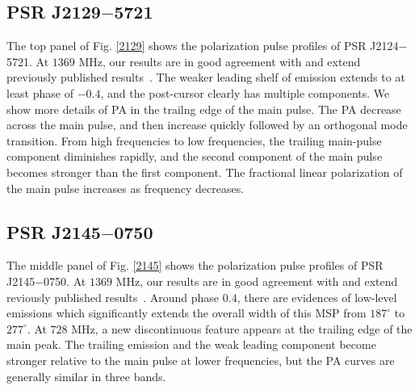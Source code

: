 \documentclass[useAMS,usenatbib]{mn2e}
\begin{document}
\begin{appendices}

\subsection{PSR J2129$-$5721}

The top panel of Fig. \ref{2129} shows the polarization pulse profiles of 
PSR J2124$-$5721.
%
At $1369$ MHz, our results are in good agreement with and extend previously 
published results~\citep{Yan11}.
%
The weaker leading shelf of emission extends to at least phase of $-0.4$, and 
the post-cursor clearly has multiple components.
%
We show more details of PA in the trailng edge of the main pulse.  
%
The PA decrease across the main pulse, and then increase quickly followed 
by an orthogonal mode transition.
%
From high frequencies to low frequencies, the trailing main-pulse component 
diminishes rapidly, and the second component of the main pulse becomes stronger
than the first component.
%
The fractional linear polarization of the main pulse increases as frequency 
decreases.


\subsection{PSR J2145$-$0750}

The middle panel of Fig. \ref{2145} shows the polarization pulse profiles of 
PSR J2145$-$0750.
%
At $1369$ MHz, our results are in good agreement with and extend reviously 
published results~\citep{Yan11}.
%
Around phase $0.4$, there are evidences of low-level emissions which 
significantly extends the overall width of this MSP from $187^{\circ}$ to 
$277^{\circ}$.
%
At $728$ MHz, a new discontinuous feature appears at the trailing edge of 
the main peak. 
%
The trailing emission and the weak leading component become stronger relative 
to the main pulse at lower frequencies, but the PA curves are generally similar 
in three bands.


\end{appendices}
\end{document}
